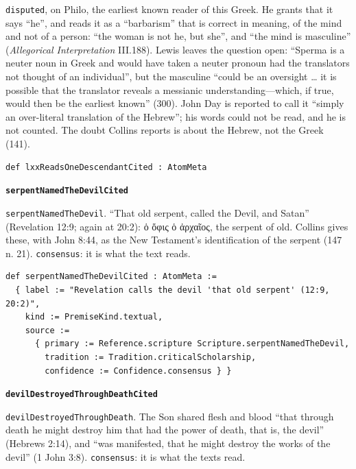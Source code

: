 \documentclass[11pt]{article}
\begin{document}
\texttt{disputed}, on Philo, the earliest known reader of this Greek. He grants that it says “he”, and reads it as a “barbarism” that is correct in meaning, of the mind and not of a person: “the woman is not he, but she”, and “the mind is masculine” (\emph{Allegorical Interpretation} III.188). Lewis leaves the question open: “Sperma is a neuter noun in Greek and would have taken a neuter pronoun had the translators not thought of an individual”, but the masculine “could be an oversight … it is possible that the translator reveals a messianic understanding—which, if true, would then be the earliest known” (300). John Day is reported to call it “simply an over-literal translation of the Hebrew”; his words could not be read, and he is not counted. The doubt Collins reports is about the Hebrew, not the Greek (141).

{\small\begin{verbatim}
def lxxReadsOneDescendantCited : AtomMeta
\end{verbatim}}
\par\medskip\noindent\textbf{\texttt{serpent\allowbreak{}Named\allowbreak{}The\allowbreak{}Devil\allowbreak{}Cited}}\par\nobreak\noindent
\texttt{serpent\allowbreak{}Named\allowbreak{}The\allowbreak{}Devil}. “That old serpent, called the Devil, and Satan” (Revelation 12:9; again at 20:2): ὁ ὄφις ὁ ἀρχαῖος, the serpent of old. Collins gives these, with John 8:44, as the New Testament’s identification of the serpent (147 n. 21). \texttt{consensus}: it is what the text reads.

{\small\begin{verbatim}
def serpentNamedTheDevilCited : AtomMeta :=
  { label := "Revelation calls the devil 'that old serpent' (12:9, 20:2)",
    kind := PremiseKind.textual,
    source :=
      { primary := Reference.scripture Scripture.serpentNamedTheDevil,
        tradition := Tradition.criticalScholarship,
        confidence := Confidence.consensus } }
\end{verbatim}}
\par\medskip\noindent\textbf{\texttt{devil\allowbreak{}Destroyed\allowbreak{}Through\allowbreak{}Death\allowbreak{}Cited}}\par\nobreak\noindent
\texttt{devil\allowbreak{}Destroyed\allowbreak{}Through\allowbreak{}Death}. The Son shared flesh and blood “that through death he might destroy him that had the power of death, that is, the devil” (Hebrews 2:14), and “was manifested, that he might destroy the works of the devil” (1 John 3:8). \texttt{consensus}: it is what the texts read.
\end{document}
